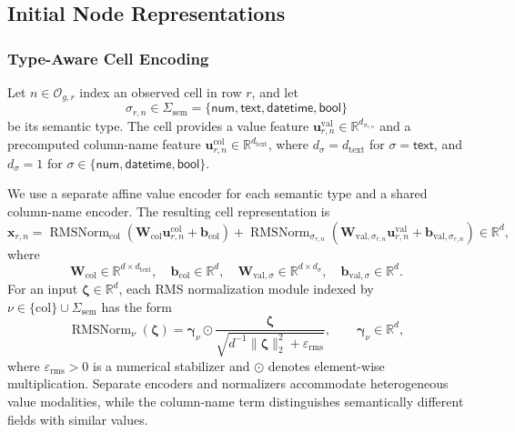 \documentclass[11pt]{article}
\newcommand{\R}{\mathbb{R}}
\DeclareMathOperator{\RMSNorm}{RMSNorm}
\begin{document}
\subsection{Initial Node Representations}
\label{sec:node-initialization}

\subsubsection{Type-Aware Cell Encoding}
\label{sec:cell-encoding}

Let \(n\in\mathcal O_{g,r}\) index an observed cell in row \(r\), and let
\begin{equation}
    \sigma_{r,n}
    \in
    \Sigma_{\mathrm{sem}}
    =
    \{\mathsf{num},\mathsf{text},\mathsf{datetime},\mathsf{bool}\}
    \label{eq:semantic-types}
\end{equation}
be its semantic type.  The cell provides a value feature
\(\mathbf u_{r,n}^{\mathrm{val}}\in\R^{d_{\sigma_{r,n}}}\) and a
precomputed column-name feature
\(\mathbf u_{r,n}^{\mathrm{col}}\in\R^{d_{\mathrm{text}}}\), where
\(d_\sigma=d_{\mathrm{text}}\) for \(\sigma=\mathsf{text}\), and
\(d_\sigma=1\) for
\(\sigma\in\{\mathsf{num},\mathsf{datetime},\mathsf{bool}\}\).

We use a separate affine value encoder for each semantic type and a shared
column-name encoder.  The resulting cell representation is
\begin{equation}
    \boxed{
    \mathbf x_{r,n}
    =
    \RMSNorm_{\mathrm{col}}
    \left(
        \mathbf W_{\mathrm{col}}
        \mathbf u_{r,n}^{\mathrm{col}}
        +
        \mathbf b_{\mathrm{col}}
    \right)
    +
    \RMSNorm_{\sigma_{r,n}}
    \left(
        \mathbf W_{\mathrm{val},\sigma_{r,n}}
        \mathbf u_{r,n}^{\mathrm{val}}
        +
        \mathbf b_{\mathrm{val},\sigma_{r,n}}
    \right)
    }
    \in\R^d,
    \label{eq:cell-encoding}
\end{equation}
where
\begin{equation}
    \mathbf W_{\mathrm{col}}
    \in\R^{d\times d_{\mathrm{text}}},
    \quad
    \mathbf b_{\mathrm{col}}\in\R^d,
    \quad
    \mathbf W_{\mathrm{val},\sigma}
    \in\R^{d\times d_\sigma},
    \quad
    \mathbf b_{\mathrm{val},\sigma}\in\R^d.
    \label{eq:cell-parameter-domains}
\end{equation}
For an input \(\boldsymbol\zeta\in\R^d\), each RMS normalization module
indexed by \(\nu\in\{\mathrm{col}\}\cup\Sigma_{\mathrm{sem}}\) has the form
\begin{equation}
    \RMSNorm_{\nu}(\boldsymbol\zeta)
    =
    \boldsymbol\gamma_\nu
    \odot
    \frac{\boldsymbol\zeta}
    {\sqrt{d^{-1}\|\boldsymbol\zeta\|_2^2+\varepsilon_{\mathrm{rms}}}},
    \qquad
    \boldsymbol\gamma_\nu\in\R^d,
    \label{eq:rmsnorm}
\end{equation}
where \(\varepsilon_{\mathrm{rms}}>0\) is a numerical stabilizer and
\(\odot\) denotes element-wise multiplication.  Separate encoders and
normalizers accommodate heterogeneous value modalities, while the
column-name term distinguishes semantically different fields with similar
values.
\end{document}

